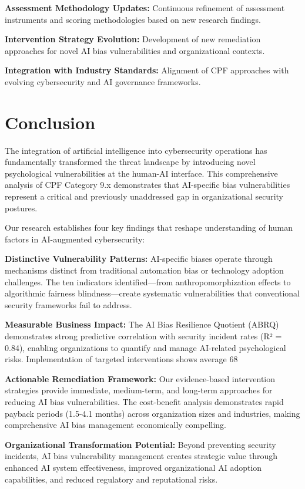 \documentclass[11pt,a4paper]{article}
\begin{document}
\textbf{Assessment Methodology Updates:} Continuous refinement of assessment instruments and scoring methodologies based on new research findings.

\textbf{Intervention Strategy Evolution:} Development of new remediation approaches for novel AI bias vulnerabilities and organizational contexts.

\textbf{Integration with Industry Standards:} Alignment of CPF approaches with evolving cybersecurity and AI governance frameworks.

\section{Conclusion}

The integration of artificial intelligence into cybersecurity operations has fundamentally transformed the threat landscape by introducing novel psychological vulnerabilities at the human-AI interface. This comprehensive analysis of CPF Category 9.x demonstrates that AI-specific bias vulnerabilities represent a critical and previously unaddressed gap in organizational security postures.

Our research establishes four key findings that reshape understanding of human factors in AI-augmented cybersecurity:

\textbf{Distinctive Vulnerability Patterns:} AI-specific biases operate through mechanisms distinct from traditional automation bias or technology adoption challenges. The ten indicators identified—from anthropomorphization effects to algorithmic fairness blindness—create systematic vulnerabilities that conventional security frameworks fail to address.

\textbf{Measurable Business Impact:} The AI Bias Resilience Quotient (ABRQ) demonstrates strong predictive correlation with security incident rates (R² = 0.84), enabling organizations to quantify and manage AI-related psychological risks. Implementation of targeted interventions shows average 68%

\textbf{Actionable Remediation Framework:} Our evidence-based intervention strategies provide immediate, medium-term, and long-term approaches for reducing AI bias vulnerabilities. The cost-benefit analysis demonstrates rapid payback periods (1.5-4.1 months) across organization sizes and industries, making comprehensive AI bias management economically compelling.

\textbf{Organizational Transformation Potential:} Beyond preventing security incidents, AI bias vulnerability management creates strategic value through enhanced AI system effectiveness, improved organizational AI adoption capabilities, and reduced regulatory and reputational risks.
\end{document}
